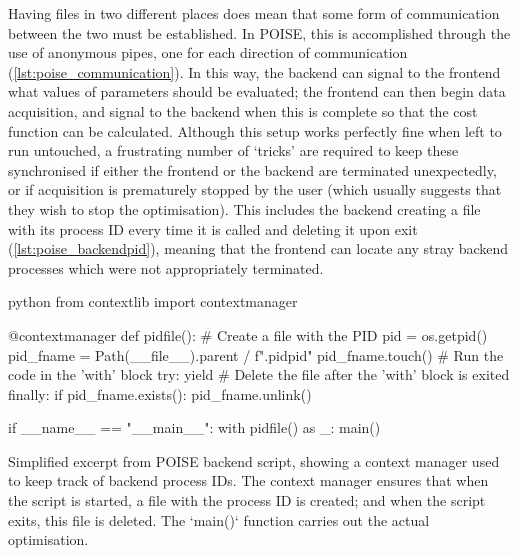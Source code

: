 Having files in two different places does mean that some form of communication between the two must be established.
In POISE, this is accomplished through the use of anonymous pipes, one for each direction of communication (\cref{lst:poise_communication}).
In this way, the backend can signal to the frontend what values of parameters should be evaluated; the frontend can then begin data acquisition, and signal to the backend when this is complete so that the cost function can be calculated.
Although this setup works perfectly fine when left to run untouched, a frustrating number of `tricks' are required to keep these synchronised if either the frontend or the backend are terminated unexpectedly, or if acquisition is prematurely stopped by the user (which usually suggests that they wish to stop the optimisation).
This includes the backend creating a file with its process ID every time it is called and deleting it upon exit (\cref{lst:poise_backendpid}), meaning that the frontend can locate any stray backend processes which were not appropriately terminated.

\begin{mylisting}[htb]
\begin{tcbminted}{python}
from contextlib import contextmanager

@contextmanager
def pidfile():
    # Create a file with the PID
    pid = os.getpid()
    pid_fname = Path(__file__).parent / f".pid{pid}"
    pid_fname.touch()
    # Run the code in the 'with' block
    try:
        yield
    # Delete the file after the 'with' block is exited
    finally:
        if pid_fname.exists():
            pid_fname.unlink()

if __name__ == "__main__":
    with pidfile() as _:
        main()
\end{tcbminted}
    \caption[Context manager to keep track of backend process IDs]{Simplified excerpt from POISE backend script, showing a context manager used to keep track of backend process IDs. The context manager ensures that when the script is started, a file with the process ID is created; and when the script exits, this file is deleted. The `main()` function carries out the actual optimisation.}
    \label{lst:poise_backendpid}
\end{mylisting}


